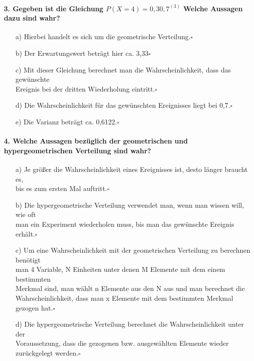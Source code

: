 \documentclass[a4paper]{article}
\begin{document}
\paragraph{3. Gegeben ist die Gleichung $P(X=4)=0,30,7^(3)$ Welche Aussagen dazu sind wahr?}
\begin{itemize}
    \item[a)]Hierbei handelt es sich um die geometrische Verteilung.\hfill $\square$
    \item[b)]Der Erwartungswert beträgt hier ca. 3,33\hfill $\square$
    \item[c)] Mit dieser Gleichung berechnet man die Wahrscheinlichkeit, dass das gewünschte\\ Ereignis bei der dritten Wiederholung eintritt.\hfill $\square$
    \item[d)]Die Wahrscheinlichkeit für das gewünschten Ereignisses liegt bei 0,7.\hfill $\square$
    \item[e)]Die Varianz beträgt ca. 0,6122.\hfill $\square$
\end{itemize}
    
\paragraph{4. Welche Aussagen bezüglich der geometrischen und hypergeometrischen Verteilung sind wahr?}
\begin{itemize}
    \item[a)]Je größer die Wahrscheinlichkeit eines Ereignisses ist, desto länger braucht es, \\ bis es zum ersten Mal auftritt.\hfill $\square$
    \item[b)]Die hypergeometrische Verteilung verwendet man, wenn man wissen will, wie oft \\man ein Experiment wiederholen muss, bis man das gewünschte Ereignis erhält.\hfill $\square$
    \item[c)] Um eine Wahrscheinlichkeit mit der geometrischen Verteilung zu berechnen benötigt\\ man 4 Variable, N Einheiten unter denen M Elemente mit dem einem bestimmten\\ Merkmal sind, man wählt n Elemente aus den N aus und man berechnet die\\ Wahrscheinlichkeit, dass man x Elemente mit dem bestimmten Merkmal gezogen hat.\hfill $\square$
    \item[d)]Die hypergeometrische Verteilung berechnet die Wahrscheinlichkeit unter der \\Voraussetzung, dass die gezogenen bzw. ausgewählten Elemente wieder \\zurückgelegt werden.\hfill $\square$
\end{itemize}
    
\end{document}
